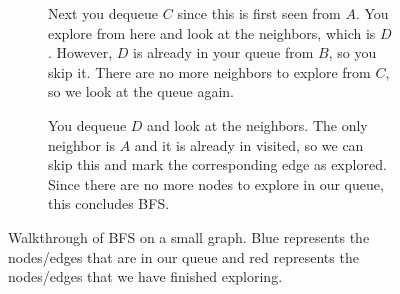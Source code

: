 \begin{example}
\begin{figure}[H]
      \begin{subfigure}[b]{0.48\textwidth}
        \centering
        \caption{Next you dequeue $C$ since this is first seen from $A$. You explore from here and look at the neighbors, which is $D$. However, $D$ is already in your queue from $B$, so you skip it. There are no more neighbors to explore from $C$, so we look at the queue again.}
      \end{subfigure}
      \hfill 
      \begin{subfigure}[b]{0.48\textwidth}
        \centering
        \caption{You dequeue $D$ and look at the neighbors. The only neighbor is $A$ and it is already in visited, so we can skip this and mark the corresponding edge as explored. Since there are no more nodes to explore in our queue, this concludes BFS.}
      \end{subfigure}
      \caption{Walkthrough of BFS on a small graph. Blue represents the nodes/edges that are in our queue and red represents the nodes/edges that we have finished exploring.}
      \label{fig:bfs_example}
    \end{figure}
  \end{example}


